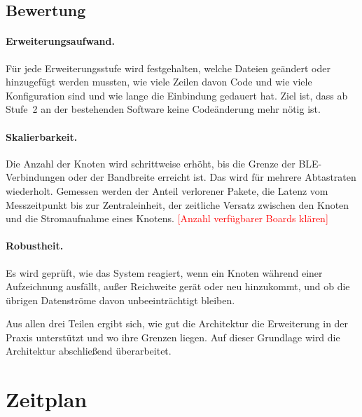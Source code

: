 \documentclass[11pt, a4paper]{article}
\newcommand{\offen}[1]{\textcolor{red}{[#1]}}
\begin{document}
\subsection{Bewertung}

\paragraph{Erweiterungsaufwand.} Für jede Erweiterungsstufe wird festgehalten, welche Dateien geändert oder hinzugefügt werden mussten, wie viele Zeilen davon Code und wie viele Konfiguration sind und wie lange die Einbindung gedauert hat. Ziel ist, dass ab Stufe~2 an der bestehenden Software keine Codeänderung mehr nötig ist.

\paragraph{Skalierbarkeit.} Die Anzahl der Knoten wird schrittweise erhöht, bis die Grenze der BLE-Verbindungen oder der Bandbreite erreicht ist. Das wird für mehrere Abtastraten wiederholt. Gemessen werden der Anteil verlorener Pakete, die Latenz vom Messzeitpunkt bis zur Zentraleinheit, der zeitliche Versatz zwischen den Knoten und die Stromaufnahme eines Knotens. \offen{Anzahl verfügbarer Boards klären}

\paragraph{Robustheit.} Es wird geprüft, wie das System reagiert, wenn ein Knoten während einer Aufzeichnung ausfällt, außer Reichweite gerät oder neu hinzukommt, und ob die übrigen Datenströme davon unbeeinträchtigt bleiben.

Aus allen drei Teilen ergibt sich, wie gut die Architektur die Erweiterung in der Praxis unterstützt und wo ihre Grenzen liegen. Auf dieser Grundlage wird die Architektur abschließend überarbeitet.

\section{Zeitplan}
\end{document}
